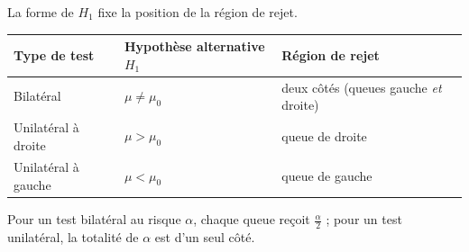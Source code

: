 \documentclass[a4paper,11pt]{article}
\begin{document}
La forme de $H_1$ fixe la position de la région de rejet.

\begin{theoreme}
\renewcommand{\arraystretch}{1.4}
\begin{center}
\begin{tabular}{@{}l l l@{}}
\toprule
\textbf{Type de test} & \textbf{Hypothèse alternative $H_1$} & \textbf{Région de rejet} \\
\midrule
Bilatéral         & $\mu \neq \mu_0$ & deux côtés (queues gauche \emph{et} droite) \\
Unilatéral à droite & $\mu > \mu_0$   & queue de droite \\
Unilatéral à gauche & $\mu < \mu_0$   & queue de gauche \\
\bottomrule
\end{tabular}
\end{center}
Pour un test bilatéral au risque $\alpha$, chaque queue reçoit $\frac{\alpha}{2}$ ; pour un test unilatéral, la totalité de $\alpha$ est d'un seul côté.
\end{theoreme}
\end{document}
